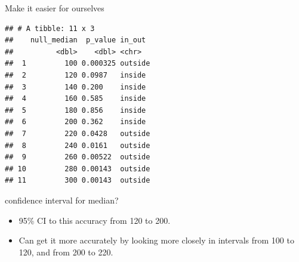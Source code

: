\documentclass[ignorenonframetext,]{beamer}
\newenvironment{Shaded}{\begin{snugshade}}{\end{snugshade}}
\newcommand{\DataTypeTok}[1]{\textcolor[rgb]{0.13,0.29,0.53}{#1}}
\newcommand{\FloatTok}[1]{\textcolor[rgb]{0.00,0.00,0.81}{#1}}
\newcommand{\KeywordTok}[1]{\textcolor[rgb]{0.13,0.29,0.53}{\textbf{#1}}}
\newcommand{\NormalTok}[1]{#1}
\newcommand{\OperatorTok}[1]{\textcolor[rgb]{0.81,0.36,0.00}{\textbf{#1}}}
\newcommand{\StringTok}[1]{\textcolor[rgb]{0.31,0.60,0.02}{#1}}
\providecommand{\tightlist}{%
  \setlength{\itemsep}{0pt}\setlength{\parskip}{0pt}}
\begin{document}
\begin{frame}[fragile]{Make it easier for ourselves}
\protect\hypertarget{make-it-easier-for-ourselves}{}

\begin{Shaded}
\end{Shaded}

\begin{verbatim}
## # A tibble: 11 x 3
##    null_median  p_value in_out 
##          <dbl>    <dbl> <chr>  
##  1         100 0.000325 outside
##  2         120 0.0987   inside 
##  3         140 0.200    inside 
##  4         160 0.585    inside 
##  5         180 0.856    inside 
##  6         200 0.362    inside 
##  7         220 0.0428   outside
##  8         240 0.0161   outside
##  9         260 0.00522  outside
## 10         280 0.00143  outside
## 11         300 0.00143  outside
\end{verbatim}

\end{frame}

\begin{frame}{confidence interval for median?}
\protect\hypertarget{confidence-interval-for-median}{}

\begin{itemize}
\tightlist
\item
  95\% CI to this accuracy from 120 to 200.
\item
  Can get it more accurately by looking more closely in intervals from
  100 to 120, and from 200 to 220.
\end{itemize}

\end{frame}
\end{document}
